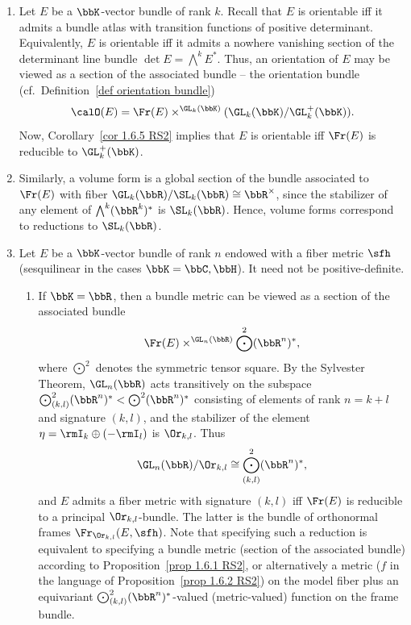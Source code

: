 \begin{example}[{{\cite[Ex.~1.6.6]{RS2}}}]\label{ex 1.6.6 RS2}
    \begin{enumerate}
        \item Let $E$ be a $\bbK$-vector bundle of rank $k$. Recall that $E$ is orientable iff it admits a bundle atlas with transition functions of positive determinant. Equivalently, $E$ is orientable iff it admits a nowhere vanishing section of the determinant line bundle $\det E=\bigwedge^k E^\ast$. Thus, an orientation of $E$ may be viewed as a section of the associated bundle -- the orientation bundle (cf.\ Definition~\ref{def orientation bundle})
        \[\calO(E)=\Fr(E)\times^{\GL_k(\bbK)}(\GL_k(\bbK)\slash \GL^+_k(\bbK)).\]
        Now, Corollary~\ref{cor 1.6.5 RS2} implies that $E$ is orientable iff $\Fr(E)$ is reducible to $\GL_k^+(\bbK)$.

        \item Similarly, a volume form is a global section of the bundle associated to $\Fr(E)$ with fiber $\GL_k(\bbR)\slash \SL_k(\bbR)\cong \bbR^\times$, since the stabilizer of any element of $\bigwedge^k (\bbR^k)^\ast$ is $\SL_k(\bbR)$. Hence, volume forms correspond to reductions to $\SL_k(\bbR)$.

        \item Let $E$ be a $\bbK$-vector bundle of rank $n$ endowed with a fiber metric $\sfh$ (sesquilinear in the cases $\bbK=\bbC,\bbH$). It need not be positive-definite.
        \begin{enumerate}
            \item If $\bbK=\bbR$, then a bundle metric can be viewed as a section of the associated bundle
            \[\Fr(E)\times^{\GL_n(\bbR)} \bigodot^2(\bbR^n)^\ast,\]
            where $\bigodot^2$ denotes the symmetric tensor square. By the Sylvester Theorem, $\GL_n(\bbR)$ acts transitively on the subspace $\bigodot^2_{(k,l)}(\bbR^n)^\ast< \bigodot^2(\bbR^n)^\ast$ consisting of elements of rank $n=k+l$ and signature $(k,l)$, and the stabilizer of the element $\eta=\rmI_k\oplus (-\rmI_l)$ is $\Or_{k,l}$. Thus
            \[\GL_n(\bbR)\slash \Or_{k,l}\cong \bigodot^2_{(k,l)}(\bbR^n)^\ast,\]
            and $E$ admits a fiber metric with signature $(k,l)$ iff $\Fr(E)$ is reducible to a principal $\Or_{k,l}$-bundle. The latter is the bundle of orthonormal frames $\Fr_{\Or_{k,l}}(E,\sfh)$. Note that specifying such a reduction is equivalent to specifying a bundle metric (section of the associated bundle) according to Proposition~\ref{prop 1.6.1 RS2}, or alternatively a metric ($f$ in the language of Proposition~\ref{prop 1.6.2 RS2}) on the model fiber plus an equivariant $\bigodot^2_{(k,l)}(\bbR^n)^\ast$-valued (metric-valued) function on the frame bundle.


\end{enumerate}
\end{enumerate}
\end{example}
